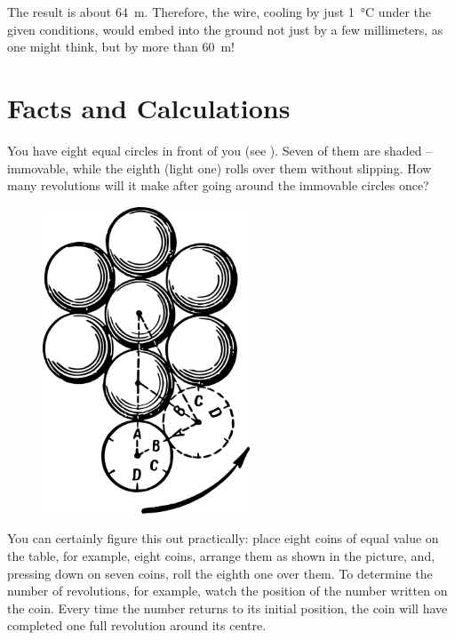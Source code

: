 The result is about \SI{64}{\meter}. Therefore, the wire, cooling by just \SI{1}{\degreeCelsius} under the given conditions, would embed into the ground not just by a few millimeters, as one might think, but by more than \SI{60}{\meter}!


\section{Facts and Calculations}
\label{sec-9.10}


\ques You have eight equal circles in front of you (see ). Seven of them are shaded -- immovable, while the eighth (light one) rolls over them without slipping. How many revolutions will it make after going around the immovable circles once?

\begin{figure}[h!]
\centering
\includegraphics[width=0.55\textwidth]{figures/ch-09/fig-127.pdf}
\end{figure}


You can certainly figure this out practically: place eight coins of equal value on the table, for example, eight coins, arrange them as shown in the picture, and, pressing down on seven coins, roll the eighth one over them. To determine the number of revolutions, for example, watch the position of the number written on the coin. Every time the number returns to its initial position, the coin will have completed one full revolution around its centre.

